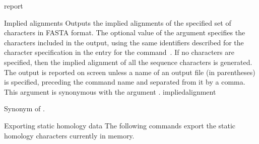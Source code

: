 \begin{command}{report}{}
\begin{arguments}
\begin{argumentgroup}{Implied alignments}
                {Outputs the implied alignments of the specified
                set of characters in FASTA format. The optional value of the
                argument specifies the characters included
                in the output, using the same identifiers described for the
                character specification in the entry for the command~. If no
                characters are specified, then the implied alignment of all the
                sequence characters is generated. The output is reported on
                screen unless a name of an output file (in parentheses) is
                specified, preceding the command name and separated from it by a
                comma. This argument is synonymous with the argument
                .}
                {impliedalignment}

                {Synonym of .}
                {}

        \end{argumentgroup}

        \begin{argumentgroup}{Exporting static homology data}
            {The following commands export the static homology characters
            currently in memory.}


\end{argumentgroup}
\end{arguments}
\end{command}
